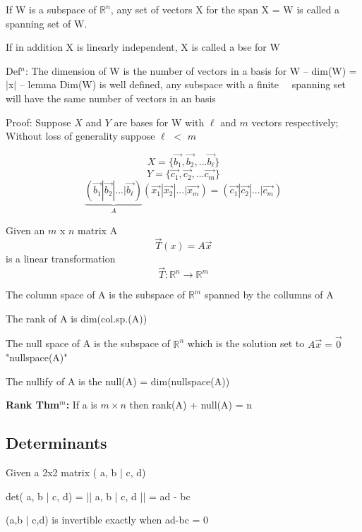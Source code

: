 

If W is a subspace of $\mathbb{R}^n$, any set of vectors X for the span X = W is called a spanning set of W.
 
If in addition X is linearly independent, X is called a bse for W
 
Def$^n$: The dimension of W is the number of vectors in a basis for W 
  -- dim(W) = $|$x$|$ 
  -- lemma Dim(W) is well defined, any subspace with a finite    \ \ spanning set will have the same number of vectors in an basis
 
Proof: Suppose $X$ and $Y$ are bases for W with $\ell$ and $m$ vectors respectively; Without loss of generality suppose $\ell$ $<$ $m$

\[X = \{ \vec{b_1} , \vec{b_2}, ... \vec{b_\ell} \}\]
\[Y = \{ \vec{c_1} , \vec{c_2}, ... \vec{c_m} \}\]
\[\underbrace{\left( \vec{b_1} | \vec{b_2}| ... | \vec{b_\ell} \right)}_A \left( \vec{x_1} | \vec{x_2}| ... | \vec{x_m} \right) = \left( \vec{c_1} | \vec{c_2}| ... | \vec{c_m} \right)\]

Given an $m$ x $n$ matrix A
\[ \vec{T}(x) = A\vec{x}\]
is a linear transformation \[\vec{T}:\mathbb{R}^n \to \mathbb{R}^m \]

The column space of A is the subspace of $\mathbb{R}^m$ spanned by the collumns of A
 
The rank of A is dim(col.sp.(A))
 
The null space of A is the subspace of $\mathbb{R}^n$ which is the solution set to $A\vec{x} = \vec{0}$ "nullspace(A)"
 
The nullify of A is the null(A) = dim(nullspace(A))
 
\textbf{Rank Thm$^m$:} If a is $m \times n$ then rank(A) + null(A) = n
 
\subsection{Determinants}
 
Given a 2x2 matrix ( a, b | c, d)
 
det( a, b | c, d) = || a, b | c, d || = ad - bc
 
(a,b | c,d) is invertible exactly when ad-bc = 0


